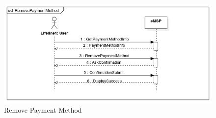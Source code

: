 \documentclass{Configuration_Files/PoliMi3i_thesis}
\begin{document}
\begin{figure}[H]
    \centering
    \includegraphics[width=1\textwidth]{Images/UseCases/RemovePaymentMethod.jpg}
    \caption{Remove Payment Method}
\end{figure}

\end{document}
